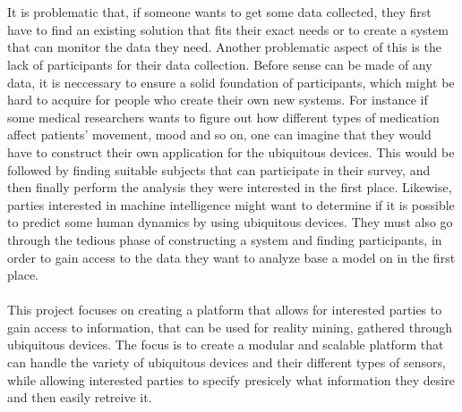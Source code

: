 \\\\
It is problematic that, if someone wants to get some data collected, they first have to find an existing solution that fits their exact needs or to create a system that can monitor the data they need. Another problematic aspect of this is the lack of participants for their data collection. Before sense can be made of any data, it is neccessary to ensure a solid foundation of participants, which might be hard to acquire for people who create their own new systems. For instance if some medical researchers wants to figure out how different types of medication affect patients' movement, mood and so on, one can imagine that they would have to construct their own application for the ubiquitous devices. This would be followed by finding suitable subjects that can participate in their survey, and then finally perform the analysis they were interested in the first place. Likewise, parties interested in machine intelligence might want to determine if it is possible to predict some human dynamics by using ubiquitous devices. They must also go through the tedious phase of constructing a system and finding participants, in order to gain access to the data they want to analyze base a model on in the first place.
\\\\
This project focuses on creating a platform that allows for interested parties to gain access to information, that can be used for reality mining, gathered through ubiquitous devices. The focus is to create a modular and scalable platform that can handle the variety of ubiquitous devices and their different types of sensors, while allowing interested parties to specify presicely what information they desire and then easily retreive it.



